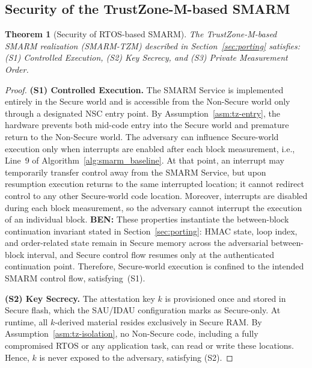 \documentclass{ieeeaccess}
\DeclareRobustCommand{\ben}[1]{{\color{BENcolor}\textbf{BEN:} #1}}
\newcommand{\smarm}{SMARM\xspace}
\newtheorem{theorem}{Theorem}[section]
\begin{document}
\subsection{Security of the TrustZone-M-based \smarm}
\label{sec:tzm-security}

\begin{theorem}[Security of RTOS-based SMARM]
\label{thm:tzm}
The TrustZone-M-based SMARM realization (SMARM-TZM) described in Section~\ref{sec:porting} satisfies: (S1) Controlled Execution,
(S2) Key Secrecy, and (S3) Private Measurement Order.
\end{theorem}

 
\begin{proof}


\textbf{(S1) Controlled Execution.}
The SMARM Service is implemented entirely in the Secure world and is accessible from the Non-Secure world only through a designated NSC entry point.
By Assumption~\ref{asm:tz-entry}, the hardware prevents both mid-code entry into the Secure world and premature return to the Non-Secure world.
The adversary can influence Secure-world execution only when interrupts are enabled after each block measurement, i.e., Line~9 of Algorithm~\ref{alg:smarm_baseline}.
At that point, an interrupt may temporarily transfer control away from the SMARM Service, but upon resumption execution returns to the same interrupted location; it cannot redirect control to any other Secure-world code location.
Moreover, interrupts are disabled during each block measurement, so the adversary cannot interrupt the execution of an individual block.
\ben{These properties instantiate the between-block continuation invariant stated in Section~\ref{sec:porting}: HMAC state, loop index, and order-related state remain in Secure memory across the adversarial between-block interval, and Secure control flow resumes only at the authenticated continuation point.}
Therefore, Secure-world execution is confined to the intended SMARM control flow, satisfying~(S1).
 
\medskip
\noindent\textbf{(S2) Key Secrecy.}
The attestation key $k$ is provisioned once and stored in Secure flash,
which the SAU/IDAU configuration marks as Secure-only.
At runtime, all $k$-derived material resides exclusively in Secure RAM.
By Assumption~\ref{asm:tz-isolation}, no Non-Secure code, including a
fully compromised RTOS or any application task, can read or write these locations.
Hence, $k$ is never exposed to the adversary, satisfying (S2).
 

\end{proof}
\end{document}
